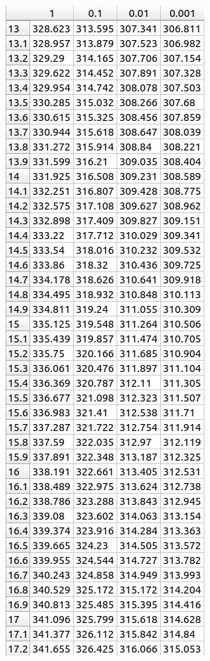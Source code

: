 \documentclass[a4paper,oneside,12pt]{extreport}
\begin{document}
\begin{enumerate}
	\begin{figure}[H]
		\centering
		\includegraphics[height=0.5\textheight]{inc/img/steph.png}
		\hspace{1cm}

\end{figure}
\end{enumerate}
\end{document}

